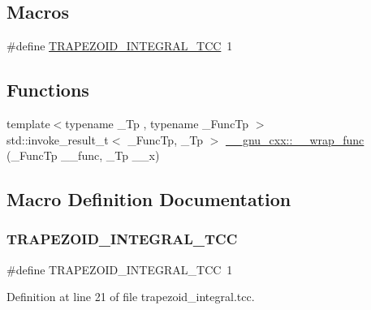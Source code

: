 \subsection*{Macros}
\begin{DoxyCompactItemize}
\item 
\#define \hyperlink{trapezoid__integral_8tcc_ab798294341b3e7d82b3ba0379ab26774}{T\+R\+A\+P\+E\+Z\+O\+I\+D\+\_\+\+I\+N\+T\+E\+G\+R\+A\+L\+\_\+\+T\+CC}~1
\end{DoxyCompactItemize}
\subsection*{Functions}
\begin{DoxyCompactItemize}
\item 
{\footnotesize template$<$typename \+\_\+\+Tp , typename \+\_\+\+Func\+Tp $>$ }\\std\+::invoke\+\_\+result\+\_\+t$<$ \+\_\+\+Func\+Tp, \+\_\+\+Tp $>$ \hyperlink{namespace____gnu__cxx_aab02d54d27832cdb3d10d6262e03278e}{\+\_\+\+\_\+gnu\+\_\+cxx\+::\+\_\+\+\_\+wrap\+\_\+func} (\+\_\+\+Func\+Tp \+\_\+\+\_\+func, \+\_\+\+Tp \+\_\+\+\_\+x)
\end{DoxyCompactItemize}


\subsection{Macro Definition Documentation}
\mbox{\label{trapezoid__integral_8tcc_ab798294341b3e7d82b3ba0379ab26774}} 
\subsubsection{\texorpdfstring{T\+R\+A\+P\+E\+Z\+O\+I\+D\+\_\+\+I\+N\+T\+E\+G\+R\+A\+L\+\_\+\+T\+CC}{TRAPEZOID\_INTEGRAL\_TCC}}
{\footnotesize\ttfamily \#define T\+R\+A\+P\+E\+Z\+O\+I\+D\+\_\+\+I\+N\+T\+E\+G\+R\+A\+L\+\_\+\+T\+CC~1}



Definition at line 21 of file trapezoid\+\_\+integral.\+tcc.

